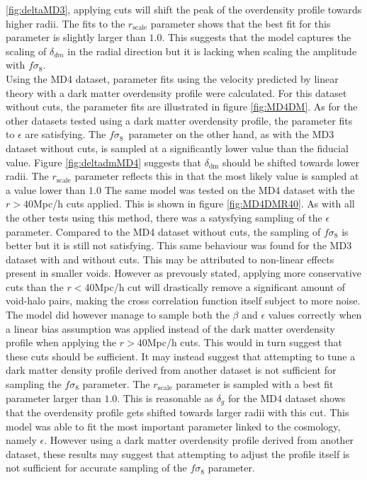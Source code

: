 \ref{fig:deltaMD3}, applying cuts will shift the peak of the overdensity profile towards higher radii. The fits to the $r_{\mathrm{scale}}$ parameter shows that the best fit for this parameter is slightly larger than $1.0$. This suggests that the model captures the scaling of $\delta_{dm}$ in the radial direction but it is lacking when scaling the amplitude with $f\sigma_8$.\\\indent
Using the MD4 dataset, parameter fits using the velocity predicted by linear theory with a dark matter overdensity profile were calculated. For this dataset without cuts, the parameter fits are illustrated in figure \ref{fig:MD4DM}. As for the other datasets tested using a dark matter overdensity profile, the parameter fits to $\epsilon$ are satisfying. The $f\sigma_8$ parameter on the other hand, as with the MD3 dataset without cuts, is sampled at a significantly lower value than the fiducial value. Figure \ref{fig:deltadmMD4} suggests that $\delta_{\mathrm{dm}}$ should be shifted towards lower radii. The $r_{\mathrm{scale}}$ parameter reflects this in that the most likely value is sampled at a value lower than $1.0$ The same model was tested on the MD4 dataset with the $r>40$Mpc/h cuts applied. This is shown in figure \ref{fig:MD4DMR40}. As with all the other tests using this method, there was a satysfying sampling of the  $\epsilon$ parameter. Compared to the MD4 dataset without cuts, the sampling of $f\sigma_8$ is better but it is still not satisfying. This same behaviour was found for the MD3 dataset with and without cuts. This may be attributed to non-linear effects present in smaller voids. However as prevously stated, applying more conservative cuts than the $r<40$Mpc/h cut will drastically remove a significant amount of void-halo pairs, making the cross correlation function itself subject to more noise. The model did however manage to sample both the $\beta$ and $\epsilon$ values correctly when a linear bias assumption was applied instead of the dark matter overdensity profile when applying the $r>40$Mpc/h cuts. This would in turn suggest that these cuts should be sufficient. It may instead suggest that attempting to tune a dark matter density profile derived from another dataset is not sufficient for sampling the $f\sigma_8$ parameter. The $r_\mathrm{scale}$ parameter is sampled with a best fit parameter larger than $1.0$. This is reasonable as $\delta_g$ for the MD4 dataset shows that the overdensity profile gets shifted towards larger radii with this cut. This model was able to fit the most important parameter linked to the cosmology, namely $\epsilon$. However using a dark matter overdensity profile derived from another dataset, these results may suggest that attempting to adjust the profile itself is not sufficient for accurate sampling of the $f\sigma_8$ parameter.

